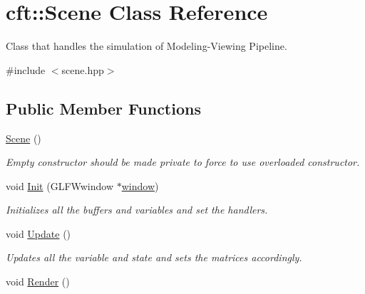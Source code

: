 \hypertarget{classcft_1_1Scene}{}\section{cft\+:\+:Scene Class Reference}
\label{classcft_1_1Scene}


Class that handles the simulation of Modeling-\/\+Viewing Pipeline.  




{\ttfamily \#include $<$scene.\+hpp$>$}

\subsection*{Public Member Functions}
\begin{DoxyCompactItemize}
\item 
\hyperlink{classcft_1_1Scene_a9805c35029c9ce04b4a962f17dfd20d1}{Scene} ()\hypertarget{classcft_1_1Scene_a9805c35029c9ce04b4a962f17dfd20d1}{}\label{classcft_1_1Scene_a9805c35029c9ce04b4a962f17dfd20d1}

\begin{DoxyCompactList}\small\item\em Empty constructor should be made private to force to use overloaded constructor. \end{DoxyCompactList}\item 
void \hyperlink{classcft_1_1Scene_a69cb8696bc40903d5e1216001fd49ae9}{Init} (G\+L\+F\+Wwindow $\ast$\hyperlink{classcft_1_1Scene_a5743ac5a5872b962da380e6b8262a347}{window})\hypertarget{classcft_1_1Scene_a69cb8696bc40903d5e1216001fd49ae9}{}\label{classcft_1_1Scene_a69cb8696bc40903d5e1216001fd49ae9}

\begin{DoxyCompactList}\small\item\em Initializes all the buffers and variables and set the handlers. \end{DoxyCompactList}\item 
void \hyperlink{classcft_1_1Scene_a2a719eb64cfde8c3dba51a9260de3b0a}{Update} ()\hypertarget{classcft_1_1Scene_a2a719eb64cfde8c3dba51a9260de3b0a}{}\label{classcft_1_1Scene_a2a719eb64cfde8c3dba51a9260de3b0a}

\begin{DoxyCompactList}\small\item\em Updates all the variable and state and sets the matrices accordingly. \end{DoxyCompactList}\item 
void \hyperlink{classcft_1_1Scene_a34f80009cb520aaafa9f4cd478538731}{Render} ()\hypertarget{classcft_1_1Scene_a34f80009cb520aaafa9f4cd478538731}{}\label{classcft_1_1Scene_a34f80009cb520aaafa9f4cd478538731}


\end{DoxyCompactItemize}
